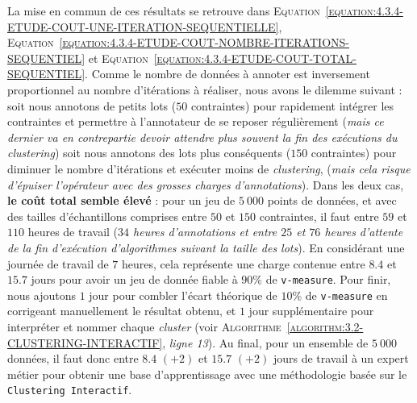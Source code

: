 			La mise en commun de ces résultats se retrouve dans \textsc{Equation~\ref{equation:4.3.4-ETUDE-COUT-UNE-ITERATION-SEQUENTIELLE}}, \textsc{Equation~\ref{equation:4.3.4-ETUDE-COUT-NOMBRE-ITERATIONS-SEQUENTIEL}} et \textsc{Equation~\ref{equation:4.3.4-ETUDE-COUT-TOTAL-SEQUENTIEL}}.
			Comme le nombre de données à annoter est inversement proportionnel au nombre d'itérations à réaliser, nous avons le dilemme suivant : soit nous annotons de petits lots ($50$ contraintes) pour rapidement intégrer les contraintes et permettre à l'annotateur de se reposer régulièrement (\textit{mais ce dernier va en contrepartie devoir attendre plus souvent la fin des exécutions du \textit{clustering}}) soit nous annotons des lots plus conséquents ($150$ contraintes) pour diminuer le nombre d'itérations et exécuter moins de \textit{clustering}, (\textit{mais cela risque d'épuiser l'opérateur avec des grosses charges d'annotations}).
			Dans les deux cas, \textbf{le coût total semble élevé} : pour un jeu de $5~000$ points de données, et avec des tailles d'échantillons comprises entre $50$ et $150$ contraintes, il faut entre $59$ et $110$ heures de travail (\textit{$34$ heures d'annotations et entre $25$ et $76$ heures d'attente de la fin d'exécution d'algorithmes suivant la taille des lots}).
			En considérant une journée de travail de $7$ heures, cela représente une charge contenue entre $8.4$ et $15.7$ jours pour avoir un jeu de donnée fiable à $90$\% de \texttt{v-measure}.
			Pour finir, nous ajoutons $1$ jour pour combler l'écart théorique de $10$\% de \texttt{v-measure} en corrigeant manuellement le résultat obtenu, et $1$ jour supplémentaire pour interpréter et nommer chaque \textit{cluster} (voir \textsc{Algorithme~\ref{algorithm:3.2-CLUSTERING-INTERACTIF}}, \textit{ligne 13}).
			Au final, pour un ensemble de $5~000$ données, il faut donc entre $8.4$ {\footnotesize $(+2)$} et $15.7$ {\footnotesize $(+2)$} jours de travail à un expert métier pour obtenir une base d'apprentissage avec une méthodologie basée sur le \texttt{Clustering Interactif}.
			
